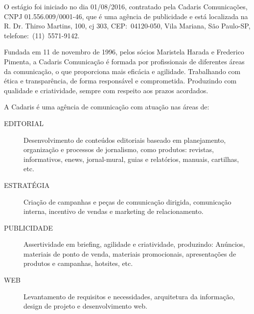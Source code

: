 \documentclass[
  12pt,				%
  openany,
  oneside,
  a4paper,			%
  english,			%
  brazil
]{article}
\numberwithin{figure}{section}
\numberwithin{table}{section}
\begin{document}


O estágio foi iniciado no dia 01/08/2016, contratado pela Cadaris Comunicações, CNPJ 01.556.009/0001-46, que é uma agência de publicidade e está localizada na R. Dr. Thirso Martins, 100, cj 303, CEP:~04120-050, Vila Mariana, São Paulo-SP, telefone:~(11)~5571-9142.

Fundada em 11 de novembro de 1996, pelos sócios Maristela Harada e Frederico Pimenta, a Cadaris Comunicação é formada por profissionais de diferentes áreas da comunicação, o que proporciona mais eficácia e agilidade. Trabalhando com ética e transparência, de forma responsável e comprometida. Produzindo com qualidade e criatividade, sempre com respeito aos prazos acordados.

A Cadaris é uma agência de comunicação com atuação nas áreas de:
\vspace{-0.5cm}

\begin{description}
   \item [EDITORIAL] Desenvolvimento de conteúdos editoriais baseado em planejamento, organização e processos de jornalismo, como produtos: revistas, informativos, enews, jornal-mural, guias e relatórios, manuais, cartilhas, etc.
   \item [ESTRATÉGIA] Criação de campanhas e peças de comunicação dirigida, comunicação interna, incentivo de vendas e marketing de relacionamento.
   \item [PUBLICIDADE]  Assertividade em briefing, agilidade e criatividade, produzindo: Anúncios, materiais de ponto de venda, materiais promocionais, apresentações de produtos e campanhas, hotsites, etc.
   \item [WEB] Levantamento de requisitos e necessidades, arquitetura da informação, design de projeto e desenvolvimento web.
\end{description}
\end{document}
